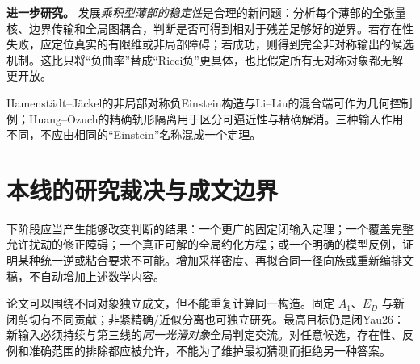 \documentclass[UTF8,fontset=fandol,zihao=-4]{ctexart}
\theoremstyle{research}
\newcommand{\proposal}{\par\noindent\textbf{进一步研究。}}
\begin{document}
\proposal
发展\emph{乘积型薄部的稳定性}是合理的新问题：分析每个薄部的全张量核、边界传输和全局图耦合，判断是否可得到相对于残差足够好的逆界。若存在性失败，应定位真实的有限维或非局部障碍；若成功，则得到完全非对称输出的候选机制。这比只将“负曲率”替成“Ricci负”更具体，也比假定所有无对称对象都无解更开放。

Hamenstädt--Jäckel的非局部对称负Einstein构造\cite{HJ}与Li--Liu的混合端\cite{LiLiu}可作为几何控制例；Huang--Ozuch的精确轨形隔离\cite{HO}用于区分可逼近性与精确解消。三种输入作用不同，不应由相同的“Einstein”名称混成一个定理。

\section{本线的研究裁决与成文边界}
下阶段应当产生能够改变判断的结果：一个更广的固定闭输入定理；一个覆盖完整允许扰动的修正障碍；一个真正可解的全局约化方程；或一个明确的模型反例，证明某种统一逆或粘合要求不可能。增加采样密度、再拟合同一径向族或重新编排文稿，不自动增加上述数学内容。

论文可以围绕不同对象独立成文，但不能重复计算同一构造。固定 $A_1$、$E_D$ 与新闭剪切有不同贡献；非紧精确/近似分离也可独立研究。最高目标仍是闭Yau26：新输入必须持续与第三线的\emph{同一光滑对象}全局判定交流。对任意候选，存在性、反例和准确范围的排除都应被允许，不能为了维护最初猜测而拒绝另一种答案。

\appendix
\end{document}
